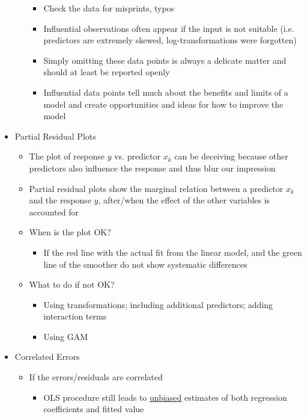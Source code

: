 \documentclass[a4paper]{article}
\begin{document}
\begin{itemize}
\begin{itemize}
        \begin{itemize}
            \item Check the data for misprints, typos
            \item Influential observations often appear if the input is not suitable (i.e. predictors are extremely skewed, log-transformations were forgotten)
            \item Simply omitting these data points is always a delicate matter and should at least be reported openly
            \item Influential data points tell much about the benefits and limits of a model and create opportunities and ideas for how to improve the model
        \end{itemize}
    \end{itemize}
    \item Partial Residual Plots
    \begin{itemize}
        \item The plot of response $y$ vs. predictor $x_k$ can be deceiving because other predictors also influence the response and thus blur our impression
        \item Partial residual plots show the marginal relation between a predictor $x_k$ and the response $y$, after/when the effect of the other variables is accounted for
        \item When is the plot OK?
        \begin{itemize}
            \item If the red line with the actual fit from the linear model, and the green line of the smoother do not show systematic differences
        \end{itemize}
        \item What to do if not OK?
        \begin{itemize}
            \item Using transformations; including additional predictors; adding interaction terms
            \item Using GAM
        \end{itemize}
    \end{itemize}
    \item Correlated Errors
    \begin{itemize}
        \item If the errors/residuals are correlated
        \begin{itemize}
            \item OLS procedure still leads to \underline{unbiased} estimates of both regression coefficients and fitted value

\end{itemize}
\end{itemize}
\end{itemize}
\end{document}
